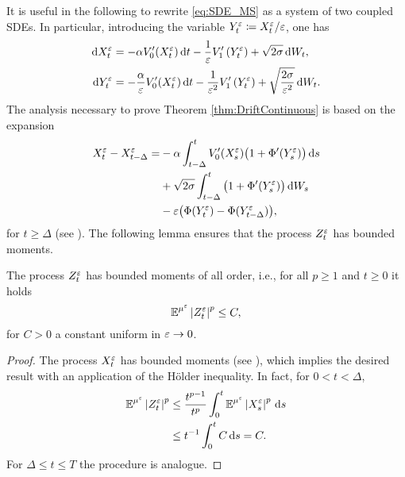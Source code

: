 \documentclass[10pt]{article}
\begin{document}
It is useful in the following to rewrite \eqref{eq:SDE_MS} as a system of two coupled SDEs. In particular, introducing the variable $Y^\varepsilon_t \coloneqq X^\varepsilon_t / \varepsilon$, one has
\begin{equation}\label{eq:SDE_MS2}
\begin{aligned}
	\mathrm{d} X_t^\varepsilon &= -\alpha V_0'(X_t^\varepsilon) \,\mathrm{d} t - \frac1{\varepsilon} V_1'\left(Y_t^\varepsilon\right) + \sqrt{2\sigma} \,\mathrm{d} W_t, \\
	\mathrm{d} Y_t^\varepsilon &= -\frac{\alpha}{\varepsilon} V_0'(X_t^\varepsilon) \,\mathrm{d} t - \frac1{\varepsilon^2} V_1'\left(Y^\varepsilon_t\right) + \sqrt{\frac{2\sigma}{\varepsilon^2}} \,\mathrm{d} W_t.
\end{aligned}
\end{equation}
The analysis necessary to prove Theorem \ref{thm:DriftContinuous} is based on the expansion 
\begin{equation}\label{eq:ContDiffDecomp}
\begin{aligned}
	X^\varepsilon_t - X^\varepsilon_{t-\Delta} = &-\alpha \int_{t-\Delta}^t V_0'(X^\varepsilon_s)\big(1 + \Phi'(Y^\varepsilon_s)\big)\,\mathrm{d} s \\
	&+\sqrt{2\sigma}\int_{t-\Delta}^t \big(1 + \Phi'(Y^\varepsilon_s)\big) \,\mathrm{d} W_s \\
	&-\varepsilon \big(\Phi(Y^\varepsilon_t)- \Phi(Y^\varepsilon_{t - \Delta})\big),
\end{aligned}
\end{equation}
for $t \geq \Delta$ (see \cite[Equation (5.8)]{PaS07}). The following lemma ensures that the process $Z^\varepsilon_t$ has bounded moments. 

\begin{lemma}\label{lem:BoundMoments} The process $Z_t^\varepsilon$ has bounded moments of all order, i.e., for all $p \geq 1$ and $t \geq 0$ it holds
	\begin{equation}
		\operatorname{\mathbb{E}}^{\mu^\varepsilon} \left\lvert Z_t^\varepsilon\right\rvert^p \leq C,
	\end{equation}
	for $C > 0$ a constant uniform in $\varepsilon \to 0$.
\end{lemma}
\begin{proof} The process $X^\varepsilon_t$ has bounded moments (see \cite[Corollary 5.4]{PaS07}), which implies the desired result with an application of the Hölder inequality. In fact, for $0 < t < \Delta$,
\begin{equation}
\begin{aligned}
	\operatorname{\mathbb{E}}^{\mu^\varepsilon} \left\lvert Z_t^\varepsilon\right\rvert^p &\leq \frac{t^{p-1}}{t^p} \int_0^t \operatorname{\mathbb{E}}^{\mu^\varepsilon} \left\lvert X_s^\varepsilon\right\rvert^p \,\mathrm{d} s \\
	&\leq t^{-1} \int_0^t C \,\mathrm{d} s = C.
\end{aligned}
\end{equation}
For $\Delta \leq t \leq T$ the procedure is analogue. 
\end{proof}
\end{document}
